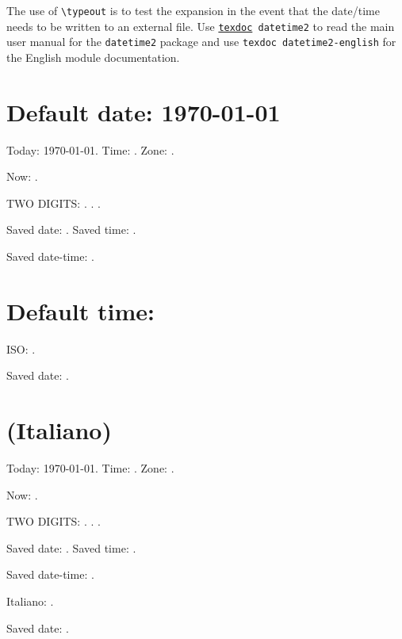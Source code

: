 \documentclass[italian]{article}
\begin{document}
\tableofcontents

The use of \verb|\typeout| is to test the expansion in the event
that the date/time needs to be written to an external file.
Use
\texttt{\href{http://www.dickimaw-books.com/latex/novices/html/texdoc.html}{texdoc} datetime2} to read the main user manual for
the \texttt{datetime2} package and use \texttt{texdoc
datetime2-english} for the English module documentation.

\section{Default date: \today}

Today: \today. Time: \DTMcurrenttime. Zone: \DTMcurrentzone.

Now: \DTMnow.

TWO DIGITS: . .
.


Saved date: .
Saved time: .

Saved date-time: .


\section{Default time: }


ISO: \DTMnow.

Saved date: .

\section{(Italiano) }
Today: \today. Time: \DTMcurrenttime. Zone: \DTMcurrentzone.

Now: \DTMnow.

TWO DIGITS: . .
.


Saved date: .
Saved time: .

Saved date-time: .

Italiano: \DTMnow.

Saved date: .
\end{document}
